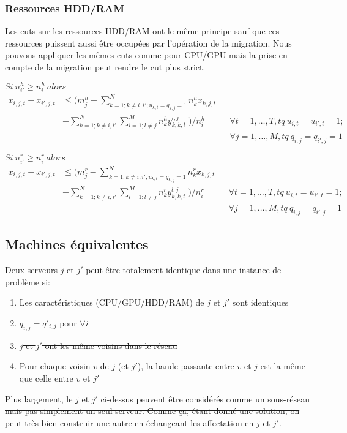 \documentclass[twoside,fleqn]{EPURapport}
\begin{document}
\subsubsection{Ressources HDD/RAM}
Les cuts sur les ressources HDD/RAM ont le même principe sauf que ces ressources puissent aussi être occupées par l'opération de la migration. Nous pouvons appliquer les mêmes cuts comme pour CPU/GPU mais la prise en compte de la migration peut rendre le cut plus strict.
\bigskip

$Si\ n^h_{i\prime}\geq n^h_{i}\ alors\;$
\begin{align}
x_{i,j,t}+x_{i\prime,j,t} &\leq (m^h_j-\sum^N_{k=1;k\neq{i},i\prime;u_{k,t}= q_{k,j}=1}{n^h_kx_{k,j,t}} \nonumber \\
 & - \sum^N_{k=1; k\neq{i},i\prime}{\sum^M_{l=1;l\neq{j}}{n^h_ky^{l,j}_{k,k,t}} }\;)/n^h_i        &&\forall t=1,\ldots,T, tq\ u_{i,t}=u_{i\prime,t}=1;  \nonumber \\
 & &&\forall j=1, \ldots, M, tq\ q_{i,j}=q_{i\prime,j}=1
\end{align}

$Si\ n^r_{i\prime}\geq n^r_{i}\ alors\;$
\begin{align}
x_{i,j,t}+x_{i\prime,j,t} &\leq (m^r_j-\sum^N_{k=1;k\neq{i},i\prime;u_{k,t}= q_{k,j}=1}{n^r_kx_{k,j,t}} \nonumber \\
 & - \sum^N_{k=1; k\neq{i},i\prime}{\sum^M_{l=1;l\neq{j}}{n^r_ky^{l,j}_{k,k,t}} }\;)/n^r_i        &&\forall t=1,\ldots,T, tq\ u_{i,t}=u_{i\prime,t}=1;  \nonumber \\
 & &&\forall j=1, \ldots, M, tq\ q_{i,j}=q_{i\prime,j}=1
\end{align}


\subsection{Machines équivalentes}
Deux serveurs $j$ et $j'$ peut être totalement identique dans une instance de problème si:
\begin{enumerate}
\item Les caractéristiques (CPU/GPU/HDD/RAM) de $j$ et $j'$ sont identiques
\item $q_{i,j} = q'_{i,j}$ pour $\forall i$
\item \sout{$j$ et $j'$ ont les même voisins dans le réseau}
\item \sout{Pour chaque voisin $v$ de $j$ (et $j'$), la bande passante entre $v$ et $j$ est la même que celle entre $v$ et $j'$}
\end{enumerate}
\bigskip
\sout{Plus largement, le $j$ et $j'$ ci-dessus peuvent être considérés comme un sous-réseau mais pas simplement un seul serveur. Comme ça, étant donné une solution, on peut très bien construir une autre en échangeant les affectation en $j$ et $j'$.}
\end{document}
